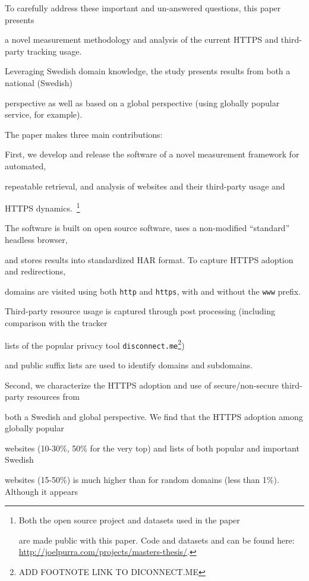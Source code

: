 \documentclass{sig-alternate-10pt}
\begin{document}
To carefully address these important and un-answered questions, this paper presents 

a novel measurement methodology and analysis of the current HTTPS and third-party tracking usage.  

Leveraging Swedish domain knowledge, the study presents results from both a national (Swedish) 

perspective as well as based on a global perspective (using globally popular service, for example).  

The paper makes three main contributions:



First, we develop and release the software of a novel measurement framework for automated, 

repeatable retrieval, and analysis of websites and their third-party usage and 

HTTPS dynamics.~\footnote{Both the open source project and datasets used in the paper 

are made public with this paper.   Code and datasets and can be found here: \url{http://joelpurra.com/projects/masters-thesis/}.}  

The software is built on open source software, uses a non-modified ``standard'' headless browser, 

and stores results into standardized HAR format.  To capture HTTPS adoption and redirections, 

domains are visited using both \texttt{http} and \texttt{https}, with and without the \texttt{www} prefix. 

Third-party resource usage is captured through post processing (including comparison with the tracker 

lists of the popular privacy tool \texttt{disconnect.me}\footnote{ADD FOOTNOTE LINK TO DICONNECT.ME}) 

and public suffix lists are used to identify domains and subdomains.



Second, we characterize the HTTPS adoption and use of secure/non-secure third-party resources from 

both a Swedish and global perspective.  We find that the HTTPS adoption among globally popular 

websites (10-30\%, 50\% for the very top) and lists of both popular and important Swedish 

websites (15-50\%) is much higher than for random domains (less than 1\%). Although it appears 
\end{document}
